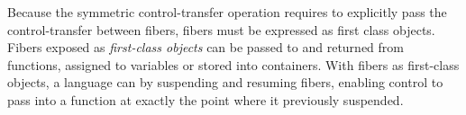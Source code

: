 
Because the symmetric control-transfer operation requires to explicitly pass
the control-transfer between fibers, fibers must be expressed as first class
objects.\\

Fibers exposed as \emph{first-class objects} can be passed to and returned from
functions, assigned to variables or stored into containers. With fibers as
first-class objects, a language can  by suspending and resuming fibers, enabling control to pass into a
function at exactly the point where it previously suspended.\\

